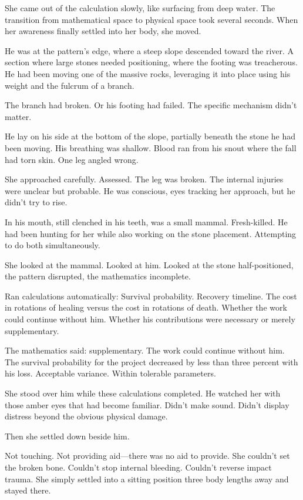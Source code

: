 She came out of the calculation slowly, like surfacing from deep water. The transition from mathematical space to physical space took several seconds. When her awareness finally settled into her body, she moved.

He was at the pattern's edge, where a steep slope descended toward the river. A section where large stones needed positioning, where the footing was treacherous. He had been moving one of the massive rocks, leveraging it into place using his weight and the fulcrum of a branch.

The branch had broken. Or his footing had failed. The specific mechanism didn't matter.

He lay on his side at the bottom of the slope, partially beneath the stone he had been moving. His breathing was shallow. Blood ran from his snout where the fall had torn skin. One leg angled wrong.

She approached carefully. Assessed. The leg was broken. The internal injuries were unclear but probable. He was conscious, eyes tracking her approach, but he didn't try to rise.

In his mouth, still clenched in his teeth, was a small mammal. Fresh-killed. He had been hunting for her while also working on the stone placement. Attempting to do both simultaneously.

She looked at the mammal. Looked at him. Looked at the stone half-positioned, the pattern disrupted, the mathematics incomplete.

Ran calculations automatically: Survival probability. Recovery timeline. The cost in rotations of healing versus the cost in rotations of death. Whether the work could continue without him. Whether his contributions were necessary or merely supplementary.

The mathematics said: supplementary. The work could continue without him. The survival probability for the project decreased by less than three percent with his loss. Acceptable variance. Within tolerable parameters.

She stood over him while these calculations completed. He watched her with those amber eyes that had become familiar. Didn't make sound. Didn't display distress beyond the obvious physical damage.

Then she settled down beside him.

Not touching. Not providing aid—there was no aid to provide. She couldn't set the broken bone. Couldn't stop internal bleeding. Couldn't reverse impact trauma. She simply settled into a sitting position three body lengths away and stayed there.

